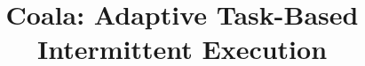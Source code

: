 \documentclass[pageno]{jpaper}
\newcommand{\sys}{Coala\xspace}
\newcommand{\sysmed}{\sys: Adaptive Task-Based Intermittent Execution}
\newcommand{\sysfull}{\sys: Adaptive Task-Based Intermittent Execution}
\begin{document}
%
%
\title{Coala: Adaptive Task-Based Intermittent Execution}
\date{}
\maketitle
%
%
%
%
%
%
%
%
%
\end{document}
